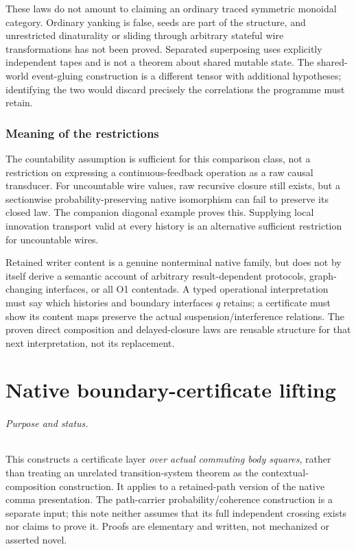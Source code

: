 \documentclass[11pt]{article}
\begin{document}
These laws do not amount to claiming an ordinary traced symmetric monoidal category. Ordinary yanking is false, seeds are part of the structure, and unrestricted dinaturality or sliding through arbitrary stateful wire transformations has not been proved. Separated superposing uses explicitly independent tapes and is not a theorem about shared mutable state. The shared-world event-gluing construction is a different tensor with additional hypotheses; identifying the two would discard precisely the correlations the programme must retain.

\section{Meaning of the restrictions}
The countability assumption is sufficient for this comparison class, not a restriction on expressing a continuous-feedback operation as a raw causal transducer. For uncountable wire values, raw recursive closure still exists, but a sectionwise probability-preserving native isomorphism can fail to preserve its closed law. The companion diagonal example proves this. Supplying local innovation transport valid at every history is an alternative sufficient restriction for uncountable wires.

Retained writer content is a genuine nonterminal native family, but does not by itself derive a semantic account of arbitrary result-dependent protocols, graph-changing interfaces, or all O1 contentads. A typed operational interpretation must say which histories and boundary interfaces $q$ retains; a certificate must show its content maps preserve the actual suspension/interference relations. The proven direct composition and delayed-closure laws are reusable structure for that next interpretation, not its replacement.


\part{Native boundary-certificate lifting}

\paragraph{Purpose and status.} This constructs a certificate layer \emph{over actual commuting body squares}, rather than treating an unrelated transition-system theorem as the contextual-composition construction. It applies to a retained-path version of the native comma presentation. The path-carrier probability/coherence construction is a separate input; this note neither assumes that its full independent crossing exists nor claims to prove it. Proofs are elementary and written, not mechanized or asserted novel.
\end{document}
